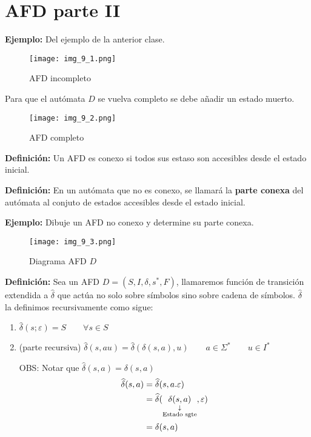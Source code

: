 \chapter{AFD parte II}
\textbf{Ejemplo: }Del ejemplo de la anterior clase.
\begin{figure}[h!]
\centering
\texttt{[image: img\_9\_1.png]}
\caption{AFD incompleto}\label{img_9_1}
\end{figure}


Para que el autómata $D$ se vuelva completo se debe añadir un estado muerto.

\begin{figure}[h!]
\centering
\texttt{[image: img\_9\_2.png]}
\caption{AFD completo}\label{img_9_2}
\end{figure}

\textbf{Definición: }Un AFD es conexo si todos sus estaso son accesibles desde el estado inicial.

\textbf{Definición: }En un autómata que no es conexo, se llamará la \textbf{parte conexa} del autómata al conjuto de estados accesibles desde el estado inicial.

\textbf{Ejemplo: }Dibuje un AFD no conexo y determine su parte conexa.
\begin{figure}[h!]
\centering
\texttt{[image: img\_9\_3.png]}
\caption{Diagrama AFD $D$}\label{img_9_3}
\end{figure}

\textbf{Definición: }Sea un AFD $D=(S,I,\delta,s^*,F)$, llamaremos función de transición extendida a $\widehat{\delta}$ que actúa no solo sobre símbolos sino sobre cadena de símbolos. $\widehat{\delta}$ la definimos recursivamente como sigue:
\begin{enumerate}
\item $\widehat{\delta}(s;\varepsilon)=S \qquad \forall s\in S$
\item (parte recursiva) $\widehat{\delta}(s,au) = \widehat{\delta}(\delta(s,a),u)\qquad a\in \Sigma^* \qquad u\in I^*$

OBS: Notar que $\widehat{\delta}(s,a)=\delta(s,a)$
\begin{align*}
\widehat{\delta}(s,a)&=\widehat{\delta}(s,a.\varepsilon)	\\
				&=\widehat{\delta}(\downlegend{\delta(s,a)}{Estado sgte},\varepsilon) \\
				&=\delta(s,a)
\end{align*}
\end{enumerate}

